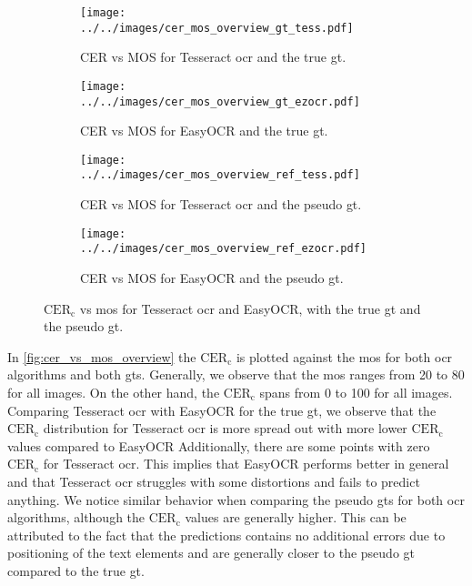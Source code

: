 \begin{figure}[h!]
    \begin{subfigure}[b]{0.45\textwidth}
        \centering
        \texttt{[image: ../../images/cer\_mos\_overview\_gt\_tess.pdf]}
        \caption{CER vs MOS for Tesseract \gls{ocr} and the true \gls{gt}.}
        \label{fig:cer_vs_mos_gt_tess}
    \end{subfigure}
    \hfill
    \begin{subfigure}[b]{0.45\textwidth}
        \centering
        \texttt{[image: ../../images/cer\_mos\_overview\_gt\_ezocr.pdf]}
        \caption{CER vs MOS for EasyOCR and the true \gls{gt}.}
        \label{fig:cer_vs_mos_gt_ocr}
    \end{subfigure}
    \newline
    \begin{subfigure}[b]{0.45\textwidth}
        \centering
        \texttt{[image: ../../images/cer\_mos\_overview\_ref\_tess.pdf]}
        \caption{CER vs MOS for Tesseract \gls{ocr} and the pseudo \gls{gt}.}
        \label{fig:cer_vs_mos_ref_tess}
    \end{subfigure}
    \hfill
    \begin{subfigure}[b]{0.45\textwidth}
        \centering
        \texttt{[image: ../../images/cer\_mos\_overview\_ref\_ezocr.pdf]}
        \caption{CER vs MOS for EasyOCR and the pseudo \gls{gt}.}
        \label{fig:cer_vs_mos_ref_ocr}
    \end{subfigure}
    \caption{$\text{CER}_{\text{c}}$ vs \gls{mos} for Tesseract \gls{ocr} and EasyOCR, with the true \gls{gt} and the pseudo \gls{gt}.}
    \label{fig:cer_vs_mos_overview}
\end{figure}

In \autoref{fig:cer_vs_mos_overview} the $\text{CER}_{\text{c}}$ is plotted against the \gls{mos} for both \gls{ocr} algorithms and both \glspl{gt}.
Generally, we observe that the \gls{mos} ranges from 20 to 80 for all images.
On the other hand, the $\text{CER}_{\text{c}}$ spans from 0 to 100 for all images.
Comparing Tesseract \gls{ocr} with EasyOCR for the true \gls{gt}, we observe that the $\text{CER}_{\text{c}}$ distribution for Tesseract \gls{ocr} is more spread out with more lower $\text{CER}_{\text{c}}$ values compared to EasyOCR
Additionally, there are some points with zero $\text{CER}_{\text{c}}$ for Tesseract \gls{ocr}.
This implies that EasyOCR performs better in general and that Tesseract \gls{ocr} struggles with some distortions and fails to predict anything.
We notice similar behavior when comparing the pseudo \glspl{gt} for both \gls{ocr} algorithms, although the $\text{CER}_{\text{c}}$ values are generally higher.
This can be attributed to the fact that the predictions contains no additional errors due to positioning of the text elements and are generally closer to the pseudo \gls{gt} compared to the true \gls{gt}.


